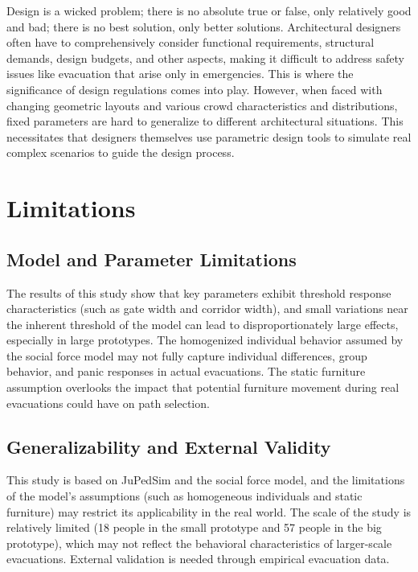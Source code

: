 Design is a wicked problem; there is no absolute true or false, only relatively good and bad; there is no best solution, only better solutions. Architectural designers often have to comprehensively consider functional requirements, structural demands, design budgets, and other aspects, making it difficult to address safety issues like evacuation that arise only in emergencies. This is where the significance of design regulations comes into play. However, when faced with changing geometric layouts and various crowd characteristics and distributions, fixed parameters are hard to generalize to different architectural situations. This necessitates that designers themselves use parametric design tools to simulate real complex scenarios to guide the design process.

\section{Limitations}

\subsection{Model and Parameter Limitations}

The results of this study show that key parameters exhibit threshold response characteristics (such as gate width and corridor width), and small variations near the inherent threshold of the model can lead to disproportionately large effects, especially in large prototypes. The homogenized individual behavior assumed by the social force model may not fully capture individual differences, group behavior, and panic responses in actual evacuations. The static furniture assumption overlooks the impact that potential furniture movement during real evacuations could have on path selection.

\subsection{Generalizability and External Validity}

This study is based on JuPedSim and the social force model, and the limitations of the model's assumptions (such as homogeneous individuals and static furniture) may restrict its applicability in the real world. The scale of the study is relatively limited (18 people in the small prototype and 57 people in the big prototype), which may not reflect the behavioral characteristics of larger-scale evacuations. External validation is needed through empirical evacuation data.

